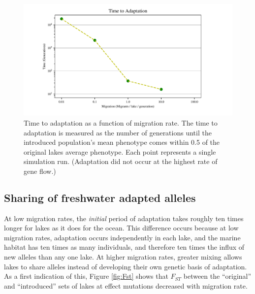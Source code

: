 \documentclass{article}
\begin{document}
\begin{figure}
	\begin{center}
  		\includegraphics{Final_Plots/Time_Adapt.pdf}
  		\caption{
		Time to adaptation as a function of migration rate.
        		The time to adaptation is measured as the number of generations until
		the introduced population's mean phenotype 
        		comes within 0.5 of the original lakes average phenotype. 
		Each point represents a single simulation run.
        		(Adaptation did not occur at the highest rate of gene flow.)
        } \label{fig:TimeToAdaptation}
	\end{center}
\end{figure}

\subsection*{Sharing of freshwater adapted alleles}

At low migration rates, the \emph{initial} period of adaptation
takes roughly ten times longer for lakes as it does for the ocean.
This difference occurs because at low migration rates, 
adaptation occurs independently in each lake,
and the marine habitat has ten times as many individuals,
and therefore ten times the influx of new alleles than any one lake. 
At higher migration rates, greater mixing
allows lakes to share alleles instead of developing their own genetic basis of adaptation. 
As a first indication of this, Figure \ref{fig:Fst} 
shows that $F_{ST}$ between the ``original'' and ``introduced'' sets of lakes 
at effect mutations decreased with migration rate.
\end{document}
